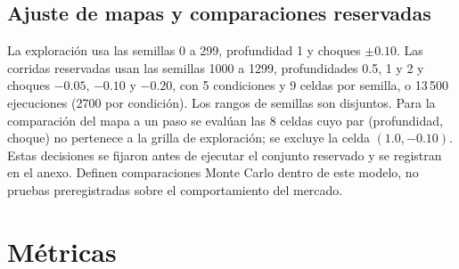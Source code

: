 \subsection{Ajuste de mapas y comparaciones reservadas}

La exploración usa las semillas 0 a 299, profundidad 1 y choques $\pm0.10$. Las corridas reservadas usan las semillas 1000 a 1299, profundidades 0.5, 1 y 2 y choques $-0.05$, $-0.10$ y $-0.20$, con 5 condiciones y 9 celdas por semilla, o 13\,500 ejecuciones (2700 por condición). Los rangos de semillas son disjuntos. Para la comparación del mapa a un paso se evalúan las 8 celdas cuyo par (profundidad, choque) no pertenece a la grilla de exploración; se excluye la celda $(1.0,-0.10)$. Estas decisiones se fijaron antes de ejecutar el conjunto reservado y se registran en el anexo. Definen comparaciones Monte Carlo dentro de este modelo, no pruebas preregistradas sobre el comportamiento del mercado.

\section{Métricas}

